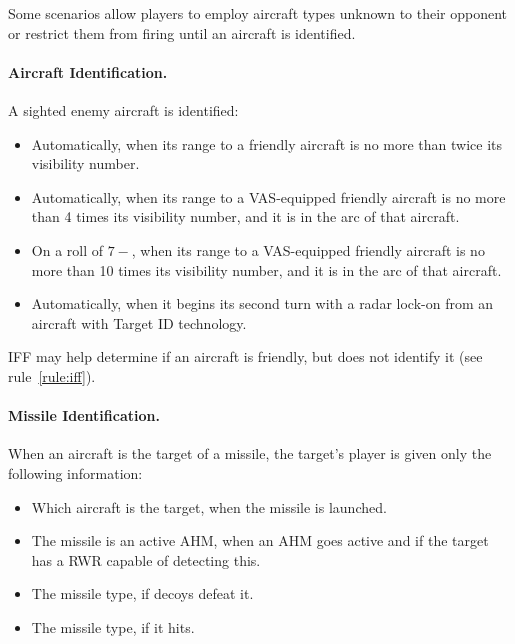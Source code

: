\begin{advancedrules}
{}{

Some scenarios allow players to employ aircraft types unknown to their opponent or restrict them from firing until an aircraft is identified.

\paragraph{Aircraft Identification.} \label{rule:aircraft-identification} A sighted enemy aircraft is identified:

\begin{itemize}

    \item Automatically, when its range to a friendly aircraft is no more than twice its visibility number.

    \item Automatically, when its range to a VAS-equipped friendly aircraft is no more than 4 times its visibility number, and it is in the  arc  of that aircraft.

    \item On a roll of $7-$, when its range to a VAS-equipped friendly aircraft is no more than 10 times its visibility number, and it is in the   arc of that aircraft.

    \item Automatically, when it begins its second turn with a radar lock-on from an aircraft with Target ID technology.

\end{itemize}

IFF may help determine if an aircraft is friendly, but does not identify it (see rule~\ref{rule:iff}).

\paragraph{Missile Identification.} 
When an aircraft is the target of a missile, the target's player is given only the following information:


\begin{itemize}
    \item Which aircraft is the target, when the missile is launched.
    \item The missile is an active AHM, when an AHM goes active and if the target has a RWR capable of detecting this.
    \item The missile type, if decoys defeat it.
    \item The missile type, if it hits.
\end{itemize}

}
\end{advancedrules}
